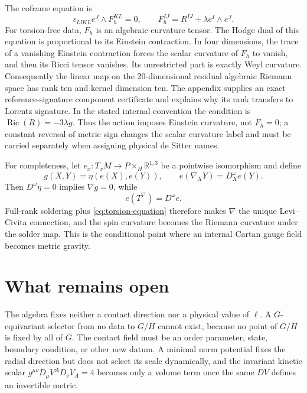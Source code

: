\documentclass[11pt]{article}
\theoremstyle{remark}\newtheorem{remark}[theorem]{Remark}
\begin{document}
The coframe equation is
\begin{equation}
 \epsilon_{IJKL}e^J\wedge F_h^{KL}=0,
 \qquad F_h^{IJ}=R^{IJ}+\lambda e^I\wedge e^J.
 \label{eq:coframe-equation}
\end{equation}
For torsion-free data, $F_h$ is an algebraic curvature tensor.
The Hodge dual of this equation is proportional to its Einstein contraction.
In four dimensions, the trace of a vanishing Einstein contraction forces the
scalar curvature of $F_h$ to vanish, and then its Ricci tensor vanishes.
Its unrestricted part is exactly Weyl curvature.
Consequently the linear map on the 20-dimensional residual algebraic
Riemann space has rank ten and kernel dimension ten.
The appendix supplies an exact reference-signature component certificate
and explains why its rank transfers to Lorentz signature.
In the stated internal convention the condition is
$\operatorname{Ric}(R)=-3\lambda g$.
Thus the action imposes Einstein curvature, not $F_h=0$; a constant reversal
of metric sign changes the scalar curvature label and must be carried
separately when assigning physical de Sitter names.

For completeness, let $e_x:T_xM\to P\times_H\mathbb R^{1,3}$ be a pointwise isomorphism
and define
\begin{equation}
 g(X,Y)=\eta(e(X),e(Y)),\qquad
 e(\nabla_XY)=D_X^\omega e(Y).
 \label{eq:solder-connection}
\end{equation}
Then $D^\omega\eta=0$ implies $\nabla g=0$, while
\begin{equation}
 e(T^\nabla)=D^\omega e.
 \label{eq:torsion-lock}
\end{equation}
Full-rank soldering plus \eqref{eq:torsion-equation} therefore makes $\nabla$ the unique
Levi--Civita connection, and the spin curvature becomes the Riemann curvature under the
solder map.  This is the conditional point where an internal Cartan gauge field becomes
metric gravity.

\section{What remains open}

The algebra fixes neither a contact direction nor a physical value of $\ell$.  A
$G$-equivariant selector from no data to $G/H$ cannot exist, because no point of $G/H$ is
fixed by all of $G$.  The contact field must be an order parameter, state, boundary
condition, or other new datum.  A minimal norm potential fixes the radial direction but
does not select its scale dynamically, and the invariant kinetic scalar
$g^{\mu\nu}D_\mu V^AD_\nu V_A=4$ becomes only a volume term once the same $DV$ defines an
invertible metric.
\end{document}
